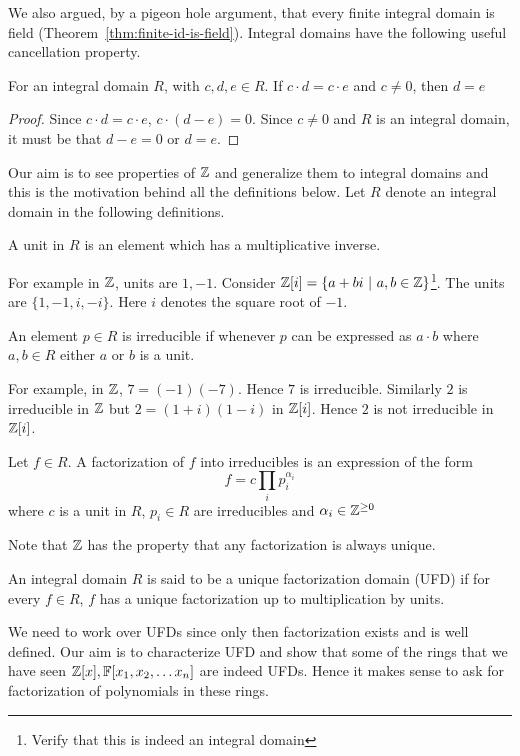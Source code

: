 We also argued, by a pigeon hole argument, that every finite integral domain is
field (Theorem~\ref{thm:finite-id-is-field}). Integral domains have the
following useful cancellation property.  
\begin{lemma} \label{lem:id-cancel}
	For an integral domain $R$, with $c,d,e \in R$. If 
	$c\cdot d = c\cdot e$ and $c \ne 0$, then $d=e$
\end{lemma}
\begin{proof}
	Since $c\cdot d = c \cdot e$, $c\cdot (d-e) = 0$. Since $c \ne 0$ and $R$ is
	an integral domain, it must be that $d-e = 0$ or $d=e$.
\end{proof}

Our aim is to see properties of ${\mathbb{Z}}$ and generalize them
to integral domains and this is the motivation behind all the definitions
below. Let $R$ denote an integral domain in the following
definitions.
\begin{definition}[Unit]
	A unit in $R$ is an element which has a multiplicative inverse.
\end{definition}
For example in ${\mathbb{Z}}$, units are $1,-1$. Consider ${\mathbb{Z}}[i] = \{a + bi ~|~ a,b \in
{\mathbb{Z}} \}$\footnote{Verify that this is indeed an integral domain}.  The units are
$\{1,-1,i,-i\}$. Here $i$ denotes the square root of $-1$.
\begin{definition}[Irreducible]
	An element $p \in R$ is irreducible if whenever $p$ can be expressed
	as $a \cdot b$ where $a,b \in R$ either $a$ or $b$ is a unit.
\end{definition}
For example, in ${\mathbb{Z}}$, $7 = (-1)(-7)$. Hence $7$ is irreducible. Similarly $2$
is irreducible in ${\mathbb{Z}}$ but $2 = (1+i)(1-i)$ in ${\mathbb{Z}}[i]$. Hence $2$ is not
irreducible in ${\mathbb{Z}}[i]$.

\begin{definition}[Factorization]
	Let $f \in R$. A factorization of $f$ into irreducibles is an
	expression of the form \[ f = c\prod_i p_i^{\alpha_i}\] where $c$ is a
	unit in $R$, $p_i \in R$ are irreducibles and $\alpha_i \in {\mathbb{Z}}^{\ge
	0}$
\end{definition}

Note that ${\mathbb{Z}}$ has the property that any factorization is always unique.
\begin{definition}
	An integral domain $R$ is said to be a unique factorization domain
	(UFD) if for every $f \in R$, $f$ has a unique factorization up to
	multiplication by units.
\end{definition}
We need to work over UFDs since only then factorization exists and is well
defined.  Our aim is to characterize UFD and show that some of the rings that
we have seen ${\mathbb{Z}}[x], {\mathbb{F}[x_1,x_2, \ldots x_n]}$ are indeed UFDs. Hence it makes sense to ask
for factorization of polynomials in these rings.

